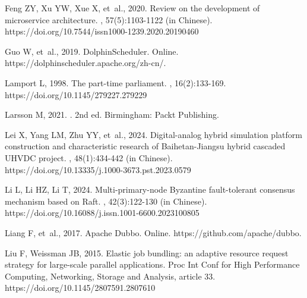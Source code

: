 \documentclass[twoside,twocolumn]{article}
\begin{document}
\begin{thebibliography}{}
Feng ZY, Xu YW, Xue X, {et~al.}, 2020.
\newblock Review on the development of microservice architecture.
, 57(5):1103-1122 (in Chinese). \\
https://doi.org/10.7544/issn1000-1239.2020.20190460


Guo W, {et~al.}, 2019.
\newblock DolphinScheduler.
\newblock Online. https://dolphinscheduler.apache.org/zh-cn/.


Lamport L, 1998.
\newblock The part-time parliament.
, 16(2):133-169. \\
https://doi.org/10.1145/279227.279229


Larsson M, 2021.
.
\newblock 2nd ed. Birmingham: Packt Publishing.


Lei X, Yang LM, Zhu YY, {et~al.}, 2024.
\newblock Digital-analog hybrid simulation platform construction and characteristic research of Baihetan-Jiangsu hybrid cascaded UHVDC project.
, 48(1):434-442 (in Chinese). \\
https://doi.org/10.13335/j.1000-3673.pst.2023.0579


Li L, Li HZ, Li T, 2024.
\newblock Multi-primary-node Byzantine fault-tolerant consensus mechanism based on Raft.
, 42(3):122-130 (in Chinese). \\
https://doi.org/10.16088/j.issn.1001-6600.2023100805


Liang F, {et~al.}, 2017.
\newblock Apache Dubbo.
\newblock Online. https://github.com/apache/dubbo.


Liu F, Weissman JB, 2015.
\newblock Elastic job bundling: an adaptive resource request strategy for large-scale parallel applications.
\newblock Proc Int Conf for High Performance Computing, Networking, Storage and Analysis, article 33. \\
https://doi.org/10.1145/2807591.2807610



\end{thebibliography}
\end{document}
